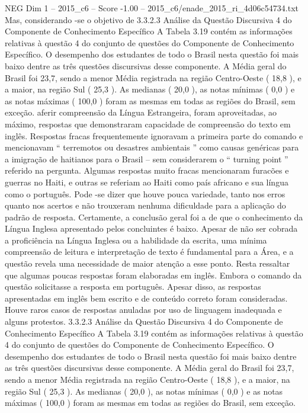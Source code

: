 \begin{textsample}{NEG Dim 1 – 2015\_c6 – Score -1.00 – 2015\_c6/enade\_2015\_ri\_4d06c54734.txt}
Mas, considerando -se o objetivo de 3.3.2.3 Análise da Questão Discursiva 4 do Componente de Conhecimento Específico A Tabela 3.19 contém as informações relativas à questão 4 do conjunto de questões do Componente de Conhecimento Específico.
O desempenho dos estudantes de todo o Brasil nesta questão foi mais baixo dentre as três questões discursivas desse componente.
A Média geral do Brasil foi 23,7, sendo a menor Média registrada na região Centro-Oeste ( 18,8 ), e a maior, na região Sul ( 25,3 ).
As medianas ( 20,0 ), as notas mínimas ( 0,0 ) e as notas máximas ( 100,0 ) foram as mesmas em todas as regiões do Brasil, sem exceção. aferir compreensão da Língua Estrangeira, foram aproveitadas, ao máximo, respostas que demonstraram capacidade de compreensão do texto em inglês.
Respostas fracas frequentemente ignoravam a primeira parte do comando e mencionavam “ terremotos ou desastres ambientais ” como causas genéricas para a imigração de haitianos para o Brasil – sem considerarem o “ turning point ” referido na pergunta.
Algumas respostas muito fracas mencionaram furacões e guerras no Haiti, e outras se referiam ao Haiti como país africano e sua língua como o português.
Pode -se dizer que houve pouca variedade, tanto nos erros quanto nos acertos e não trouxeram nenhuma dificuldade para a aplicação do padrão de resposta.
Certamente, a conclusão geral foi a de que o conhecimento da Língua Inglesa apresentado pelos concluintes é baixo.
Apesar de não ser cobrada a proficiência na Língua Inglesa ou a habilidade da escrita, uma mínima compreensão de leitura e interpretação de texto é fundamental para a Área, e a questão revela uma necessidade de maior atenção a esse ponto.
Resta ressaltar que algumas poucas respostas foram elaboradas em inglês.
Embora o comando da questão solicitasse a resposta em português.
Apesar disso, as respostas apresentadas em inglês bem escrito e de conteúdo correto foram consideradas.
Houve raros casos de respostas anuladas por uso de linguagem inadequada e alguns protestos. 3.3.2.3 Análise da Questão Discursiva 4 do Componente de Conhecimento Específico A Tabela 3.19 contém as informações relativas à questão 4 do conjunto de questões do Componente de Conhecimento Específico.
O desempenho dos estudantes de todo o Brasil nesta questão foi mais baixo dentre as três questões discursivas desse componente.
A Média geral do Brasil foi 23,7, sendo a menor Média registrada na região Centro-Oeste ( 18,8 ), e a maior, na região Sul ( 25,3 ).
As medianas ( 20,0 ), as notas mínimas ( 0,0 ) e as notas máximas ( 100,0 ) foram as mesmas em todas as regiões do Brasil, sem exceção.

\end{textsample}
